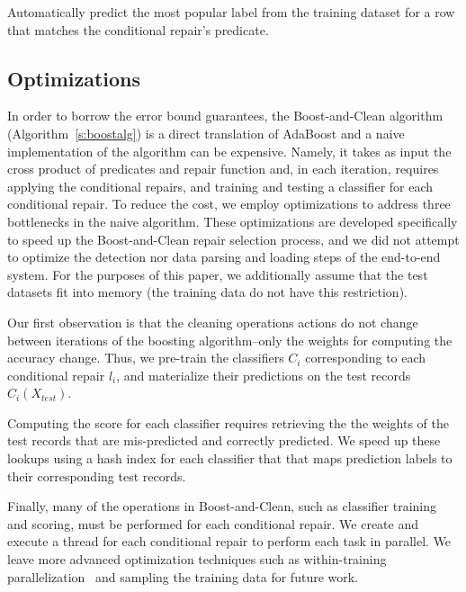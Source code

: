  Automatically predict the most popular label from the training dataset for a row that matches the conditional repair's predicate.




\subsection{Optimizations}
In order to borrow the error bound guarantees, the Boost-and-Clean algorithm (Algorithm~\ref{s:boostalg}) is a direct translation of AdaBoost and a naive implementation of the algorithm can be expensive.  Namely, it takes as input the cross product of predicates and repair function and, in each iteration, requires applying the conditional repairs, and training and testing a classifier for each conditional repair.  
To reduce the cost, we employ optimizations to address three bottlenecks in the naive algorithm.  These optimizations are developed specifically to speed up the Boost-and-Clean repair selection process, and we did not attempt to optimize the detection nor data parsing and loading steps of the end-to-end system.  For the purposes of this paper, we additionally assume that the test datasets fit into memory (the training data do not have this restriction).

 Our first observation is that the cleaning operations actions do not change between iterations of the boosting algorithm--only the weights for computing the accuracy change.  Thus, we pre-train the classifiers $C_i$ corresponding to each conditional repair $l_i$, and materialize their predictions on the test records $C_i(X_{test})$.  

 Computing the score for each classifier requires retrieving the the weights of the test records that are mis-predicted and correctly predicted.  We speed up these lookups using a hash index for each classifier that that maps prediction labels to their corresponding test records.

  Finally, many of the operations in Boost-and-Clean, such as classifier training and scoring, must be performed for each conditional repair.  We create and execute a thread for each conditional repair to perform each task in parallel.  We leave more advanced optimization techniques such as within-training parallelization~\cite{recht2011hogwild} and sampling the training data for future work.